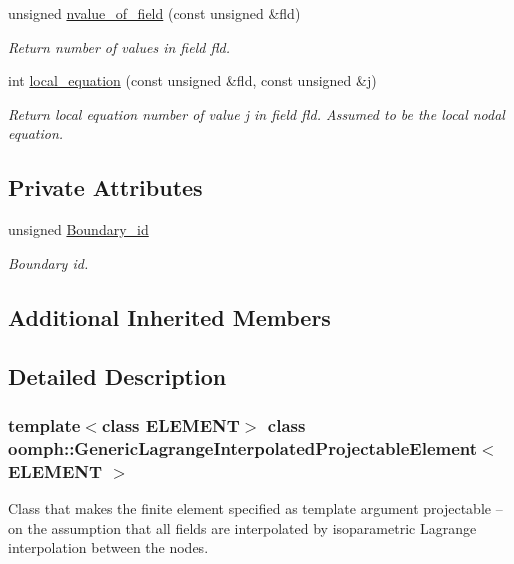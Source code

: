 \begin{DoxyCompactItemize}
unsigned \hyperlink{classoomph_1_1GenericLagrangeInterpolatedProjectableElement_ab2dddff594eedd24a1db29b17ab8868b}{nvalue\+\_\+of\+\_\+field} (const unsigned \&fld)
\begin{DoxyCompactList}\small\item\em Return number of values in field fld. \end{DoxyCompactList}\item 
int \hyperlink{classoomph_1_1GenericLagrangeInterpolatedProjectableElement_ab1d0d99536b2d4f1c935d39d01a943fa}{local\+\_\+equation} (const unsigned \&fld, const unsigned \&j)
\begin{DoxyCompactList}\small\item\em Return local equation number of value j in field fld. Assumed to be the local nodal equation. \end{DoxyCompactList}\end{DoxyCompactItemize}
\subsection*{Private Attributes}
\begin{DoxyCompactItemize}
\item 
unsigned \hyperlink{classoomph_1_1GenericLagrangeInterpolatedProjectableElement_a06c826acbeab80472cfcccbf72df2b19}{Boundary\+\_\+id}
\begin{DoxyCompactList}\small\item\em Boundary id. \end{DoxyCompactList}\end{DoxyCompactItemize}
\subsection*{Additional Inherited Members}


\subsection{Detailed Description}
\subsubsection*{template$<$class E\+L\+E\+M\+E\+NT$>$\newline
class oomph\+::\+Generic\+Lagrange\+Interpolated\+Projectable\+Element$<$ E\+L\+E\+M\+E\+N\+T $>$}

Class that makes the finite element specified as template argument projectable -- on the assumption that all fields are interpolated by isoparametric Lagrange interpolation between the nodes. 

